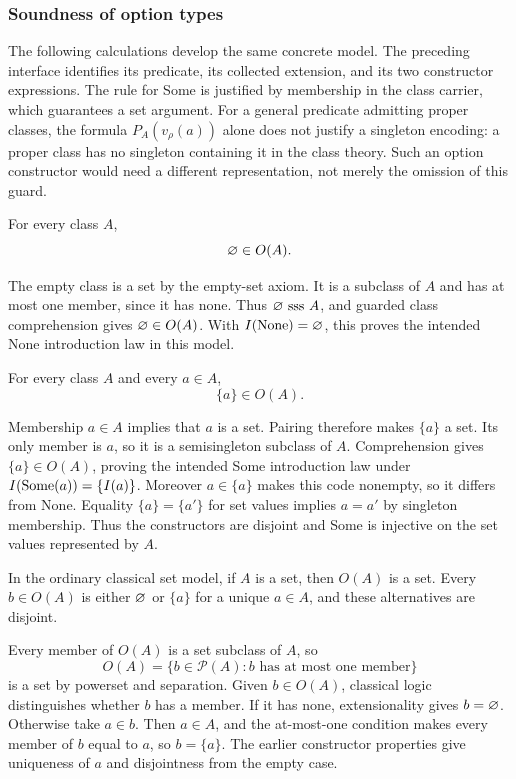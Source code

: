 \subsubsection{Soundness of option types}
The following calculations develop the same concrete model. The preceding
interface identifies its predicate, its collected extension, and its two
constructor expressions. The rule for Some is justified by membership
in the class carrier, which guarantees a set argument. For a general
predicate admitting proper classes, the formula $P_A(v_\rho(a))$ alone
does not justify a singleton encoding: a proper class has no singleton
containing it in the class theory. Such an option constructor would need
a different representation, not merely the omission of this guard.

\begin{theorem}
For every class $A$,
\[
\varnothing\in O(A).
\]
\end{theorem}
\Proof
The empty class is a set by the empty-set axiom. It is a subclass of
$A$ and has at most one member, since it has none. Thus
$\varnothing\mathrm{\ sss\ } A$, and guarded class comprehension gives
$\varnothing\in O(A)$. With $I(\mathrm{None})=\varnothing$, this proves the
intended None introduction law in this model.
\Done

\begin{theorem}
For every class $A$ and every $a\in A$,
\[
\{a\}\in O(A).
\]
\end{theorem}
\Proof
Membership $a\in A$ implies that $a$ is a set. Pairing therefore makes
$\{a\}$ a set. Its only member is $a$, so it is a semisingleton
subclass of $A$. Comprehension gives $\{a\}\in O(A)$, proving the
intended Some introduction law under $I(\mathrm{Some}(a))=\{I(a)\}$.
Moreover $a\in\{a\}$ makes this code nonempty, so it differs from
None. Equality $\{a\}=\{a'\}$ for set values implies $a=a'$ by
singleton membership. Thus the constructors are disjoint and Some is
injective on the set values represented by $A$.
\Done

\begin{theorem}
In the ordinary classical set model, if $A$ is a set, then $O(A)$
is a set. Every $b\in O(A)$ is either $\varnothing$ or $\{a\}$
for a unique $a\in A$, and these alternatives are disjoint.
\end{theorem}
\Proof
Every member of $O(A)$ is a set subclass of $A$, so
\[
O(A)=\{b\in\mathcal P(A):b\text{ has at most one member}\}
\]
is a set by powerset and separation. Given $b\in O(A)$, classical
logic distinguishes whether $b$ has a member. If it has none,
extensionality gives $b=\varnothing$. Otherwise take $a\in b$.
Then $a\in A$, and the at-most-one condition makes every member of
$b$ equal to $a$, so $b=\{a\}$. The earlier constructor properties
give uniqueness of $a$ and disjointness from the empty case.
\Done

